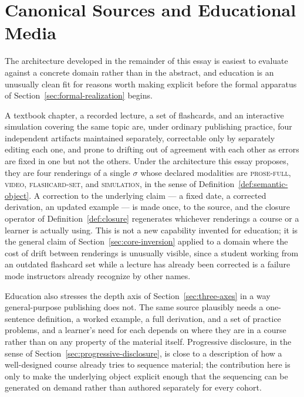 \documentclass[11pt]{article}
\theoremstyle{definition}
\begin{document}
\section{Canonical Sources and Educational Media}
\label{sec:educational-media}

The architecture developed in the remainder of this essay is easiest to evaluate against a concrete domain rather than in the abstract, and education is an unusually clean fit for reasons worth making explicit before the formal apparatus of Section~\ref{sec:formal-realization} begins.

A textbook chapter, a recorded lecture, a set of flashcards, and an interactive simulation covering the same topic are, under ordinary publishing practice, four independent artifacts maintained separately, correctable only by separately editing each one, and prone to drifting out of agreement with each other as errors are fixed in one but not the others. Under the architecture this essay proposes, they are four renderings of a single $\sigma$ whose declared modalities are \textsc{prose-full}, \textsc{video}, \textsc{flashcard-set}, and \textsc{simulation}, in the sense of Definition~\ref{def:semantic-object}. A correction to the underlying claim --- a fixed date, a corrected derivation, an updated example --- is made once, to the source, and the closure operator of Definition~\ref{def:closure} regenerates whichever renderings a course or a learner is actually using. This is not a new capability invented for education; it is the general claim of Section~\ref{sec:core-inversion} applied to a domain where the cost of drift between renderings is unusually visible, since a student working from an outdated flashcard set while a lecture has already been corrected is a failure mode instructors already recognize by other names.

Education also stresses the depth axis of Section~\ref{sec:three-axes} in a way general-purpose publishing does not. The same source plausibly needs a one-sentence definition, a worked example, a full derivation, and a set of practice problems, and a learner's need for each depends on where they are in a course rather than on any property of the material itself. Progressive disclosure, in the sense of Section~\ref{sec:progressive-disclosure}, is close to a description of how a well-designed course already tries to sequence material; the contribution here is only to make the underlying object explicit enough that the sequencing can be generated on demand rather than authored separately for every cohort.
\end{document}
